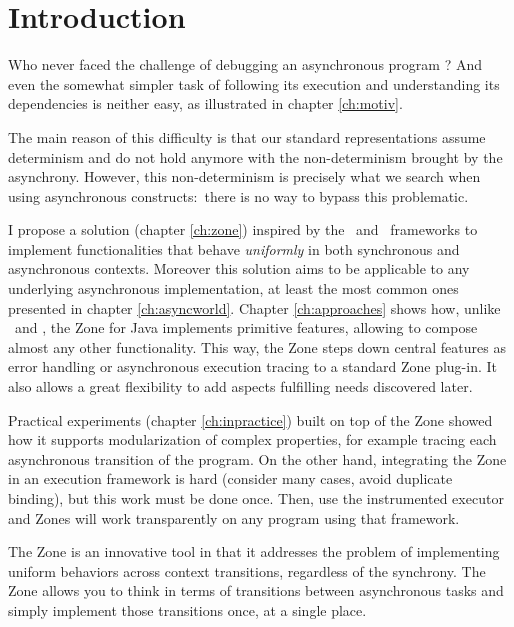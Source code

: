 
\chapter{Introduction}
\label{ch:intro}

Who never faced the challenge of debugging an asynchronous program ? And even the somewhat simpler task of following its execution and understanding its dependencies is neither easy, as illustrated in chapter \ref{ch:motiv}.

The main reason of this difficulty is that our standard representations assume determinism and do not hold anymore with the non-determinism brought by the asynchrony.
However, this non-determinism is precisely what we search when using asynchronous constructs:~there is no way to bypass this problematic.

I propose a solution (chapter \ref{ch:zone}) inspired by the \zonejs\ and \zonedrt\ frameworks to implement functionalities that behave \emph{uniformly} in both synchronous and asynchronous contexts. Moreover this solution aims to be applicable to any underlying asynchronous implementation, at least the most common ones presented in chapter \ref{ch:asyncworld}. Chapter \ref{ch:approaches} shows how, unlike \zonejs\ and \zonedrt, the Zone for Java implements primitive features, allowing to compose almost any other functionality. This way, the Zone steps down central features as error handling or asynchronous execution tracing to a standard Zone plug-in. It also allows a great flexibility to add aspects fulfilling needs discovered later.

Practical experiments (chapter \ref{ch:inpractice}) built on top of the Zone showed how it supports modularization of complex properties, for example tracing each asynchronous transition of the program. On the other hand, integrating the Zone in an execution framework is hard (consider many cases, avoid duplicate binding), but this work must be done once. Then, use the instrumented executor and Zones will work transparently on any program using that framework.

The Zone is an innovative tool in that it addresses the problem of implementing uniform behaviors across context transitions, regardless of the synchrony. The Zone allows you to think in terms of transitions between asynchronous tasks and simply implement those transitions once, at a single place.









